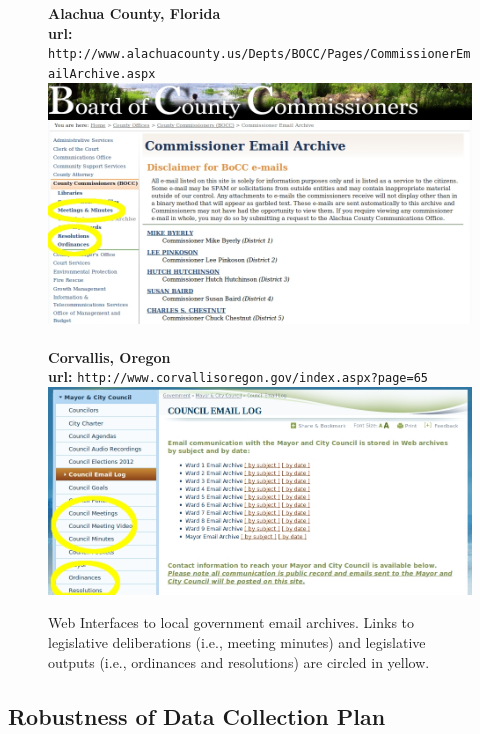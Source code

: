 \begin{figure}
\begin{center}
{\bf Alachua County, Florida} \\
 {\bf url:} \texttt{http://www.alachuacounty.us/Depts/BOCC/Pages/CommissionerEmailArchive.aspx} \\
 \includegraphics[scale=.45]{AlachuaBOCC.jpg} \\~\\
 {\bf Corvallis, Oregon} \\
 {\bf url:} \texttt{http://www.corvallisoregon.gov/index.aspx?page=65} \\
  \includegraphics[scale=.45]{CorvallisOR.jpg}
\end{center}
\caption{Web Interfaces to local government email archives. Links to legislative deliberations (i.e., meeting minutes) and legislative outputs (i.e., ordinances and resolutions) are circled in yellow.}
\end{figure}


\subsection{Robustness of Data Collection Plan}

